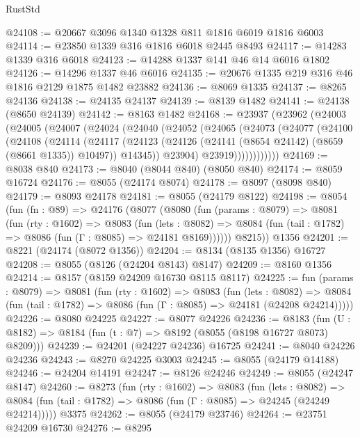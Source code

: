 \begin{lexlean}{RustStd}
\begin{coremodule}
@24108 := @20667 @3096 @1340 @1328 @811 @1816 @6019 @1816 @6003
@24114 := @23850 @1339 @316 @1816 @6018 @2445 @8493
@24117 := @14283 @1339 @316 @6018
@24123 := @14288 @1337 @141 @46 @14 @6016 @1802
@24126 := @14296 @1337 @46 @6016
@24135 := @20676 @1335 @219 @316 @46 @1816 @2129 @1875 @1482 @23882
@24136 := @8069 @1335
@24137 := @8265 @24136
@24138 := @24135 @24137
@24139 := @8139 @1482
@24141 := @24138 (@8650 @24139)
@24142 := @8163 @1482
@24168 := @23937
    (@23962
      (@24003
        (@24005
          (@24007
            (@24024
              (@24040
                (@24052
                  (@24065
                    (@24073
                      (@24077
                        (@24100
                          (@24108
                            (@24114
                              (@24117
                                (@24123
                                  (@24126 (@24141 (@8654 @24142) (@8659 (@8661 @1335)) @10497))
                                  @14345))
                              @23904)
                            @23919))))))))))))
@24169 := @8038 @840
@24173 := @8040 (@8044 @840) (@8050 @840)
@24174 := @8059 @16724
@24176 := @8055 (@24174 @8074)
@24178 := @8097 (@8098 @840)
@24179 := @8093 @24178
@24181 := @8055 (@24179 @8122)
@24198 := @8054
    (fun (fn : @89) =>
    @24176
      (@8077
        (@8080
          (fun (params : @8079) =>
          @8081
            (fun (rty : @1602) =>
            @8083
              (fun (lets : @8082) =>
              @8084 (fun (tail : @1782) => @8086 (fun (Γ : @8085) => @24181 @8169))))))
        @8215))
    @1356
@24201 := @8221 (@24174 (@8072 @1356))
@24204 := @8134 (@8135 @1356) @16727
@24208 := @8055 (@8126 (@24204 @8143) @8147)
@24209 := @8160 @1356
@24214 := @8157 (@8159 @24209 @16730 @8115 @8117)
@24225 := fun (params : @8079) =>
  @8081
    (fun (rty : @1602) =>
    @8083
      (fun (lets : @8082) =>
      @8084 (fun (tail : @1782) => @8086 (fun (Γ : @8085) => @24181 (@24208 @24214)))))
@24226 := @8080 @24225
@24227 := @8077 @24226
@24236 := @8183
    (fun (U : @8182) => @8184 (fun (t : @7) => @8192 (@8055 (@8198 @16727 @8073) @8209)))
@24239 := @24201 (@24227 @24236) @16725
@24241 := @8040 @24226 @24236
@24243 := @8270 @24225 @3003
@24245 := @8055 (@24179 @14188)
@24246 := @24204 @14191
@24247 := @8126 @24246
@24249 := @8055 (@24247 @8147)
@24260 := @8273
    (fun (rty : @1602) =>
    @8083
      (fun (lets : @8082) =>
      @8084 (fun (tail : @1782) => @8086 (fun (Γ : @8085) => @24245 (@24249 @24214)))))
    @3375
@24262 := @8055 (@24179 @23746)
@24264 := @23751 @24209 @16730
@24276 := @8295

\end{coremodule}
\end{lexlean}
